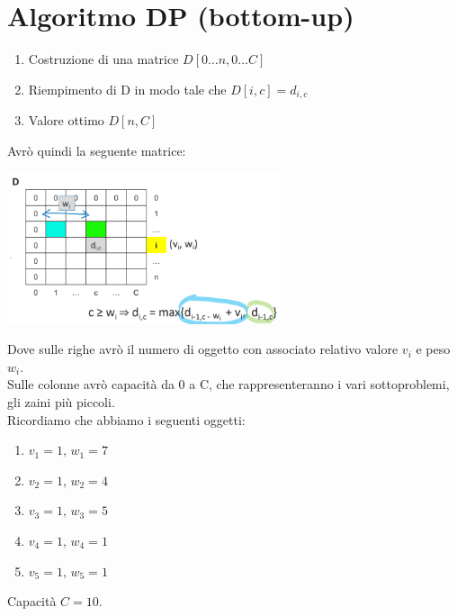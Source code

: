 \section{Algoritmo DP (bottom-up)}
\begin{enumerate}
    \item Costruzione di una matrice $D[0\dots n, 0\dots C]$
    \item Riempimento di D in modo tale che $D[i,c] = d_{i,c}$
    \item Valore ottimo \ra $D[n,C]$
\end{enumerate}
Avrò quindi la seguente matrice:
\begin{center}
    \includegraphics[width=80mm,scale=0.5]{chapters_ulerich/img/knapsack_matrix.png}
\end{center}
Dove sulle righe avrò il numero di oggetto con associato relativo valore $v_i$ e peso $w_i$.\\
Sulle colonne avrò capacità da 0 a C, che rappresenteranno i vari sottoproblemi, gli zaini più
piccoli.\\
Ricordiamo che abbiamo i seguenti oggetti:
\begin{enumerate}
    \item $v_1 = 1,\, w_1 = 7$
    \item $v_2 = 1,\, w_2 = 4$
    \item $v_3 = 1,\, w_3 = 5$
    \item $v_4 = 1,\, w_4 = 1$
    \item $v_5 = 1,\, w_5 = 1$
\end{enumerate}
Capacità $C=10$.
